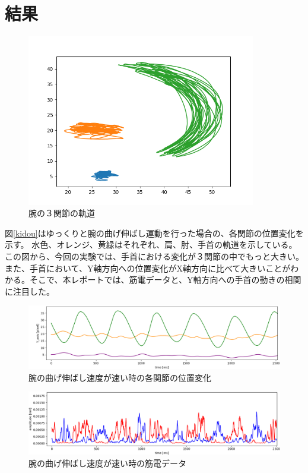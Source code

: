 \documentclass{jsarticle}
\begin{document}
\clearpage
\section{結果}

\begin{figure}[h]
	\begin{center} %
		\includegraphics[width=10cm]{graph_image/slow.png}
		\caption{腕の３関節の軌道} %
		\label{fig:kidou} %
	\end{center}
\end{figure}
図\ref{kidou}はゆっくりと腕の曲げ伸ばし運動を行った場合の、各関節の位置変化を示す。
水色、オレンジ、黄緑はそれぞれ、肩、肘、手首の軌道を示している。
この図から、今回の実験では、手首における変化が３関節の中でもっと大きい。また、手首において、Y軸方向への位置変化がX軸方向に比べて大きいことがわかる。そこで、本レポートでは、筋電データと、Y軸方向への手首の動きの相関に注目した。

\begin{figure}[!h]
	\begin{center}
		\includegraphics[width=17cm]{graph_image/fast_position.png}
		\caption{腕の曲げ伸ばし速度が速い時の各関節の位置変化}
		\label{fig:fast_position}
	\end{center}
\end{figure}


\begin{figure}[!h]
	\begin{center}
		\includegraphics[width=17cm]{graph_image/fast_EMG.png}
		\caption{腕の曲げ伸ばし速度が速い時の筋電データ}
		\label{fig:fast_EMG}
	\end{center}
\end{figure}
\clearpage
\end{document}
